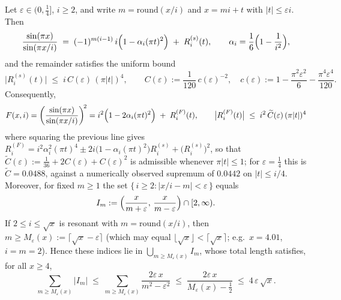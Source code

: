 \medskip
\begin{lemma}\label{lem:resonance}
Let $\varepsilon\in(0,\tfrac14]$, $i\ge2$, and write $m=\mathrm{round}(x/i)$ and $x=mi+t$ with $|t|\le \varepsilon i$. Then
\[
\frac{\sin(\pi x)}{\sin(\pi x/i)} \;=\; (-1)^{m(i-1)}\,i\Bigl(1-\alpha_i(\pi t)^2\Bigr)\;+\;R_i^{(s)}(t),
\qquad
\alpha_i=\frac{1}{6}\Bigl(1-\frac{1}{i^{2}}\Bigr),
\]
and the remainder satisfies the uniform bound
\[
\bigl|R_i^{(s)}(t)\bigr|\;\le\; i\,C(\varepsilon)\,(\pi|t|)^4,
\qquad
C(\varepsilon):=\frac{1}{120}\,c(\varepsilon)^{-2},\quad
c(\varepsilon):=1-\frac{\pi^2\varepsilon^2}{6}-\frac{\pi^4\varepsilon^4}{120}.
\]
Consequently,
\[
F(x,i)=\left(\frac{\sin(\pi x)}{\sin(\pi x/i)}\right)^{\!2}
= i^2\Bigl(1-2\alpha_i(\pi t)^2\Bigr)\;+\;R_i^{(F)}(t),
\qquad
\bigl|R_i^{(F)}(t)\bigr|\;\le\; i^2\,\widetilde C(\varepsilon)\,(\pi|t|)^4
\]
where squaring the previous line gives $R_i^{(F)}=i^2\alpha_i^2(\pi t)^4\pm2i\bigl(1-\alpha_i(\pi t)^2\bigr)R_i^{(s)}+\bigl(R_i^{(s)}\bigr)^2$, so that $\widetilde C(\varepsilon):=\tfrac1{36}+2C(\varepsilon)+C(\varepsilon)^2$ is admissible whenever $\pi|t|\le1$; for $\varepsilon=\tfrac14$ this is $\widetilde C=0.0488$, against a numerically observed supremum of $0.0442$ on $|t|\le i/4$.
Moreover, for fixed $m\ge1$ the set $\{\,i\ge2:|x/i-m|<\varepsilon\,\}$ equals
\[
I_m:=\Bigl(\frac{x}{m+\varepsilon},\,\frac{x}{m-\varepsilon}\Bigr)\cap [2,\infty).
\]
If $2\le i\le\sqrt{x}$ is resonant with $m=\mathrm{round}(x/i)$, then $m\ge M_\varepsilon(x):=\lceil\sqrt{x}-\varepsilon\rceil$ (which may equal $\lfloor\sqrt{x}\rfloor<\lceil\sqrt{x}\rceil$; e.g.\ $x=4.01$, $i=m=2$). Hence these indices lie in $\bigcup_{m\ge M_\varepsilon(x)}I_m$, whose total length satisfies, for all $x\ge 4$,
\[
\sum_{m\ge M_\varepsilon(x)}\! |I_m|
\;\le\;\sum_{m\ge M_\varepsilon(x)}\frac{2\varepsilon\,x}{m^2-\varepsilon^2}
\;\le\; \frac{2\varepsilon\,x}{M_\varepsilon(x)-\tfrac12}
\;\le\; 4\,\varepsilon\,\sqrt{x}.
\]


\end{lemma}
